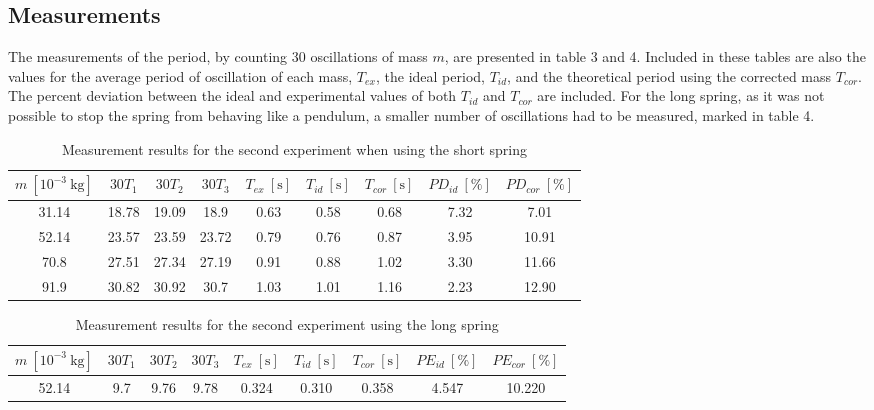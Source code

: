 \documentclass[a4paper, 10pt]{article}
\newcommand{\unit}[1]{~\mathrm{#1}}
\begin{document}
\begin{justify}
\subsection{Measurements}
The measurements of the period, by counting 30 oscillations of mass $m$, are
presented in table 3 and 4. Included in these tables are also the values for the
average period of oscillation of each mass, $T_{ex}$, the ideal period, $T_{id}$,
and the theoretical period using the corrected mass $T_{cor}$. The percent
deviation between the ideal and experimental values of both $T_{id}$ and
$T_{cor}$ are included. For the long spring, as it was not possible to stop the
spring from behaving like a pendulum, a smaller number of oscillations had to be
measured, marked in table 4.
\begin{table}[!h]
    \centering
    \caption{Measurement results for the second experiment when using the short spring}
    \label{tab:3}
    \begin{tabular}{|c|c|c|c|c|c|c|c|c|} 
    \hline
     $m~[10^{-3} \unit{kg}]$ & $30 T_1$  & $30 T_2$  & $30 T_3$  & $T_{ex}~[\mathrm{s}]$    & $T_{id} \unit{[s]}$     & $T_{cor} \unit{[s]}$    & $PD_{id} \unit{[\%]}$ & $PD_{cor} \unit{[\%]}$  \\ 
    \hline
    31.14            & 18.78 & 19.09 & 18.9  & 0.63 & 0.58 & 0.68 & 7.32  & 7.01    \\ 
    \hline
    52.14            & 23.57 & 23.59 & 23.72 & 0.79 & 0.76 & 0.87 & 3.95  & 10.91    \\ 
    \hline
    70.8             & 27.51 & 27.34 & 27.19 & 0.91 & 0.88 & 1.02 & 3.30  & 11.66    \\ 
    \hline
    91.9             & 30.82 & 30.92 & 30.7  & 1.03 & 1.01 & 1.16 & 2.23 & 12.90    \\
    \hline
    \end{tabular}
\end{table}
\begin{table}[!h]
    \centering
    \caption{Measurement results for the second experiment using the long spring}
    \begin{tabular}{|c|c|c|c|c|c|c|c|c|} 
        \hline
        $m~[10^{-3}\unit{kg}]$ & $30 T_1$ & $30 T_2$  & $30 T_3$  & $T_{ex} \unit{[s]}$    & $T_{id} \unit{[s]}$     & $T_{cor} \unit{[s]}$    & $PE_{id}\unit{[\%]}$     & $PE_{cor}\unit{[\%]}$     \\ 
        \hline
        52.14     & 9.7   & 9.76  & 9.78  & 0.324 & 0.310 & 0.358 & 4.547 & 10.220  \\ 
        \hline

\end{tabular}
\end{table}
\end{justify}
\end{document}

